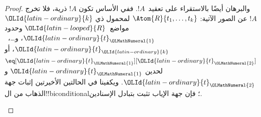 \documentclass[../../../include/open-logic-section]{subfiles}
\begin{document}
\begin{proof}
والبرهان أيضًا بالاستقراء على تعقيد~$!A$. ففي الأساس تكون $!A$
ذرية، فلا تخرج $!A$ عن الصور الآتية:
$\Atom{R}{t_1, \dots, t_k}$ لمحمول ذي $\OLId{latin-ordinary}{k}$ مواضع~$\OLId{latin-looped}{R}$
وحدود $\OLId{latin-ordinary}{t}_\OLMathNumeral{1}$، و\dots،~$\OLId{latin-ordinary}{t}_\OLId{latin-ordinary}{k}$، أو $\eq[\OLId{latin-ordinary}{t}_\OLMathNumeral{1}][\OLId{latin-ordinary}{t}_\OLMathNumeral{2}]$ لحدين $\OLId{latin-ordinary}{t}_\OLMathNumeral{1}$
و$\OLId{latin-ordinary}{t}_\OLMathNumeral{2}$. ويكفينا في الحالتين الأخيرتين إثبات جهة الذهاب من
ال!!{biconditional}؛ فإن جهة الإياب تثبت بتبادل الإسنادين.

\begin{enumerate}



\end{enumerate}
\end{proof}
\end{document}
